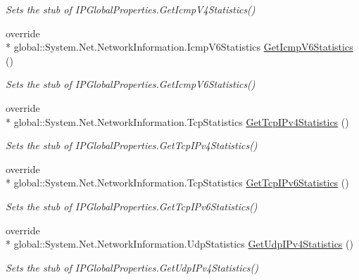 \begin{DoxyCompactItemize}
\begin{DoxyCompactList}\small\item\em Sets the stub of I\-P\-Global\-Properties.\-Get\-Icmp\-V4\-Statistics()\end{DoxyCompactList}\item 
override \\*
global\-::\-System.\-Net.\-Network\-Information.\-Icmp\-V6\-Statistics \hyperlink{class_system_1_1_net_1_1_network_information_1_1_fakes_1_1_stub_i_p_global_properties_a7ac6f7a5156c4f0da5bd3b902d55efbe}{Get\-Icmp\-V6\-Statistics} ()
\begin{DoxyCompactList}\small\item\em Sets the stub of I\-P\-Global\-Properties.\-Get\-Icmp\-V6\-Statistics()\end{DoxyCompactList}\item 
override \\*
global\-::\-System.\-Net.\-Network\-Information.\-Tcp\-Statistics \hyperlink{class_system_1_1_net_1_1_network_information_1_1_fakes_1_1_stub_i_p_global_properties_ae333a39f2ed7b5a7063106bc5465ff61}{Get\-Tcp\-I\-Pv4\-Statistics} ()
\begin{DoxyCompactList}\small\item\em Sets the stub of I\-P\-Global\-Properties.\-Get\-Tcp\-I\-Pv4\-Statistics()\end{DoxyCompactList}\item 
override \\*
global\-::\-System.\-Net.\-Network\-Information.\-Tcp\-Statistics \hyperlink{class_system_1_1_net_1_1_network_information_1_1_fakes_1_1_stub_i_p_global_properties_af041bee7471f3dfd621e9087dc47d694}{Get\-Tcp\-I\-Pv6\-Statistics} ()
\begin{DoxyCompactList}\small\item\em Sets the stub of I\-P\-Global\-Properties.\-Get\-Tcp\-I\-Pv6\-Statistics()\end{DoxyCompactList}\item 
override \\*
global\-::\-System.\-Net.\-Network\-Information.\-Udp\-Statistics \hyperlink{class_system_1_1_net_1_1_network_information_1_1_fakes_1_1_stub_i_p_global_properties_a2a4f261f915fd66430f5db9b510e8cf9}{Get\-Udp\-I\-Pv4\-Statistics} ()
\begin{DoxyCompactList}\small\item\em Sets the stub of I\-P\-Global\-Properties.\-Get\-Udp\-I\-Pv4\-Statistics()\end{DoxyCompactList}\item 

\end{DoxyCompactItemize}
